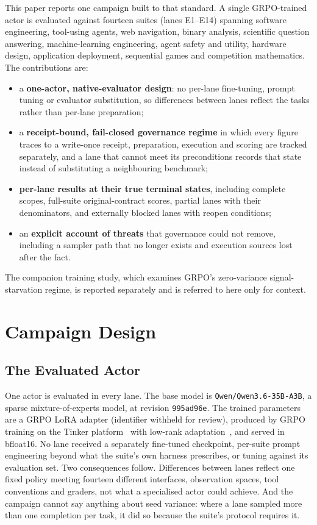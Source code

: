 \documentclass[runningheads]{llncs}
\newcommand{\adapter}{a GRPO LoRA adapter (identifier withheld for review)}
\begin{document}
This paper reports one campaign built to that standard. A single GRPO-trained
actor is evaluated against fourteen suites (lanes E1--E14) spanning software
engineering, tool-using agents, web navigation, binary analysis, scientific
question answering, machine-learning engineering, agent safety and utility,
hardware design, application deployment, sequential games and competition
mathematics. The contributions are:
\begin{itemize}
\item a \textbf{one-actor, native-evaluator design}: no per-lane fine-tuning,
prompt tuning or evaluator substitution, so differences between lanes reflect
the tasks rather than per-lane preparation;
\item a \textbf{receipt-bound, fail-closed governance regime} in which every
figure traces to a write-once receipt, preparation, execution and scoring are
tracked separately, and a lane that cannot meet its preconditions records that
state instead of substituting a neighbouring benchmark;
\item \textbf{per-lane results at their true terminal states}, including
complete scopes, full-suite original-contract scores, partial lanes with their
denominators, and externally blocked lanes with reopen conditions;
\item an \textbf{explicit account of threats} that governance could not remove,
including a sampler path that no longer exists and execution sources lost after
the fact.
\end{itemize}
The companion training study, which examines GRPO's zero-variance
signal-starvation regime, is reported separately and is referred to here only
for context.

\section{Campaign Design}

\subsection{The Evaluated Actor}

One actor is evaluated in every lane. The base model is
\texttt{Qwen/Qwen3.6-35B-A3B}, a sparse mixture-of-experts model, at revision
\texttt{995ad96e}. The trained parameters are \adapter, produced by GRPO
training on the Tinker platform~\cite{thinkingmachines2024tinker} with low-rank
adaptation~\cite{hu2022lora}, and served in bfloat16. No lane received a
separately fine-tuned checkpoint, per-suite prompt engineering beyond what the
suite's own harness prescribes, or tuning against its evaluation set.
Two consequences follow. Differences between lanes reflect one fixed policy
meeting fourteen different interfaces, observation spaces, tool conventions
and graders, not what a specialised actor could achieve. And the campaign
cannot say anything about seed variance: where a lane sampled more than one
completion per task, it did so because the suite's protocol requires it.
\end{document}
